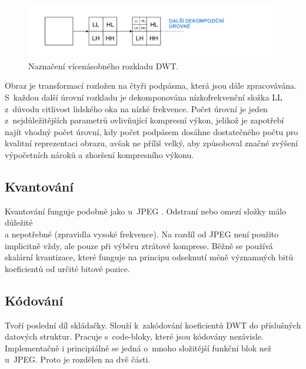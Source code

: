 \begin{figure}[hbt!]
  \centering
  \includegraphics[width=16cm]{obrazky-figures/Artboard4.pdf}
  \caption{Naznačení vícenásobného rozkladu DWT.}
  \label{retezec}
\end{figure}

\noindent Obraz je transformací rozložen na čtyři podpásma, která jsou dále zpracovávána. S~každou další úrovní rozkladu je dekomponována nízkofrekvenční složka LL z~důvodu citlivost lidského oka na nízké frekvence. Počet úrovní je jeden z~nejdůležitějších parametrů ovlivňující kompresní výkon, jelikož je zapotřebí najít vhodný počet úrovní, kdy počet podpásem dosáhne dostatečného počtu pro kvalitní reprezentaci obrazu, avšak ne příliš velký, aby způsoboval značné zvýšení výpočetních nároků a zhoršení kompresního výkonu. 


\subsection*{Kvantování}
Kvantování funguje podobně jako u~JPEG \cite{qua}. Odstraní nebo omezí složky málo důležité\\a nepotřebné (zpravidla vysoké frekvence). Na rozdíl od JPEG není použito implicitně vždy, ale pouze při výběru ztrátové komprese. Běžně se používá skalární kvantizace, které funguje na principu odseknutí méně významných bitů koeficientů od určité bitové pozice. 

\subsection*{Kódování}
Tvoří poslední díl skládačky. Slouží k~zakódování koeficientů DWT do příslušných datových struktur. Pracuje s~code-bloky, které jsou kódovány nezávisle. Implementačně i principiálně se jedná o~mnoho složitější funkční blok než u~JPEG. Proto je rozdělen na dvě části.

